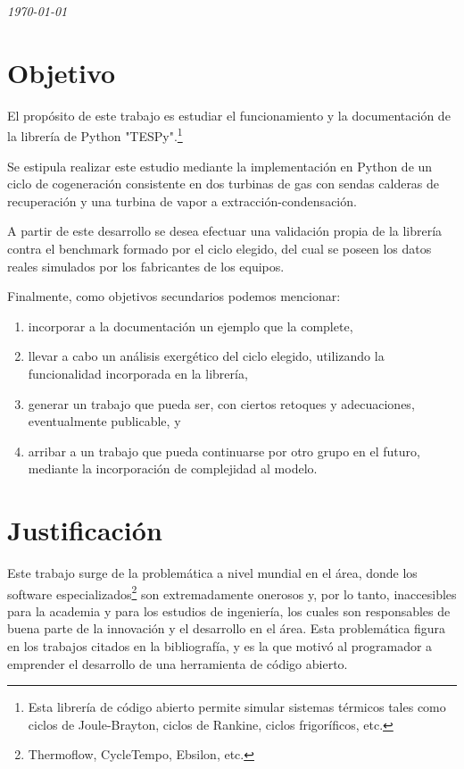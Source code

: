 \documentclass[a4paper]{article}
\begin{document}
\begin{flushright}
\textit{\today}
\end{flushright}

\newpage
\normalsize

\section*{Objetivo}

El propósito de este trabajo es estudiar el funcionamiento y la documentación de la librería de Python "TESPy".\footnote{Esta librería de código abierto permite simular sistemas térmicos tales como ciclos de Joule-Brayton, ciclos de Rankine, ciclos frigoríficos, etc.}

Se estipula realizar este estudio mediante la implementación en Python de un ciclo de cogeneración consistente en dos turbinas de gas con sendas calderas de recuperación y una turbina de vapor a extracción-condensación.

A partir de este desarrollo se desea efectuar una validación propia de la librería contra el benchmark formado por el ciclo elegido, del cual se poseen los datos reales simulados por los fabricantes de los equipos.

Finalmente, como objetivos secundarios podemos mencionar:
\begin{enumerate}
    \item incorporar a la documentación un ejemplo que la complete,
    \item llevar a cabo un análisis exergético del ciclo elegido, utilizando la funcionalidad incorporada en la librería,
    \item generar un trabajo que pueda ser, con ciertos retoques y adecuaciones, eventualmente publicable, y
    \item arribar a un trabajo que pueda continuarse por otro grupo en el futuro, mediante la incorporación de complejidad al modelo.
\end{enumerate}

\section*{Justificación}

Este trabajo surge de la problemática a nivel mundial en el área, donde los software especializados\footnote{Thermoflow, CycleTempo, Ebsilon, etc.} son extremadamente onerosos y, por lo tanto, inaccesibles para la academia y para los estudios de ingeniería, los cuales son responsables de buena parte de la innovación y el desarrollo en el área. Esta problemática figura en los trabajos citados en la bibliografía, y es la que motivó al programador a emprender el desarrollo de una herramienta de código abierto.
\end{document}
